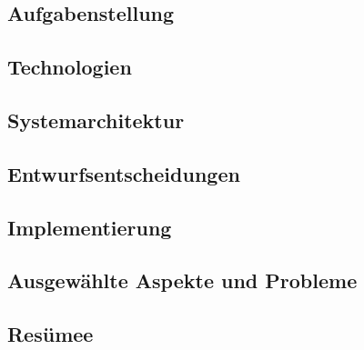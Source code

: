 \documentclass[12pt,a4paper,titlepage,listof=totoc,bibliography=totoc,chapteratlists=0pt]{scrreprt}
\begin{document}
\begin{spacing}{1}
    \chapter{Aufgabenstellung}
\end{spacing}


\begin{spacing}{1}
    \chapter{Technologien}\label{chapter:system-architecture}
\end{spacing}


\begin{spacing}{1}
    \chapter{Systemarchitektur}\label{chapter:system-architecture}
\end{spacing}



\begin{spacing}{1}
    \chapter{Entwurfsentscheidungen}\label{chapter:Entwurfsentscheidungen}
\end{spacing}


\begin{spacing}{1}
    \chapter{Implementierung}\label{chapter:implementation}
\end{spacing}



\begin{spacing}{1}
    \chapter{Ausgewählte Aspekte und Probleme}\label{chapter:probleme}
\end{spacing}


\begin{spacing}{1}
    \chapter{Resümee}
\end{spacing}


\newpage
{}
\setcounter{page}{\value{RPages}}

\glsnogroupskiptrue
\printglossary[title=Glossar,toctitle=Glossar] %
\listoffigures
\listoftables
\lstlistoflistings
\appendix
{}

\newpage
{}
\end{document}
